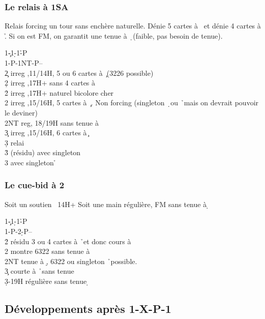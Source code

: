 \documentclass[a4paper]{article}
\begin{document}
\subsubsection{Le relais à 1SA}

Relais forcing un tour sans enchère naturelle. Dénie 5 cartes à \s\ et dénie 4 cartes à \h . 
Si on est FM, on garantit une tenue à \d\ (faible, pas besoin de tenue).

\begin{bidtable}
1\c-1\d-1\h-P\\
1\s-P-1NT-P--\\
2\c \> irreg ,11/14H, 5 ou 6 cartes à \c\ (3226 possible)\\
2\d \> irreg ,17H+ sans 4 cartes à \h \\
2\h \> irreg ,17H+ naturel bicolore cher\\
2\s \> irreg ,15/16H, 5 cartes à \c\ . Non forcing (singleton \d\ ou \h\ mais on devrait pouvoir le deviner)\\
2NT \> reg, 18/19H sans tenue à \d \\
3\c \> irreg ,15/16H, 6 cartes à \c \+\\
3\d \> relai\+\\
3\h \> (résidu) avec singleton \d \\
3\s \> avec singleton \h \-\-
\end{bidtable}

\subsubsection{Le cue-bid à 2 \pdfd}

Soit un soutien \s\ 14H+
Soit une main régulière, FM sans tenue à \d 

\begin{bidtable}
1\c-1\d-1\h-P\\
1\s-P-2\d-P--\\
2\h \> résidu 3 ou 4 cartes à \h\ et donc cours à \d \\
2\s \> montre 6322 sans tenue à \d \\
2NT \> tenue à \d , 6322 ou singleton \h\ possible.\\
3\c \> courte à \h\ sans tenue \d \\
3\d {}-19H régulière sans tenue \d 
\end{bidtable}

\subsection{Développements après 1\pdfh-X-P-1\pdfs}
\end{document}
